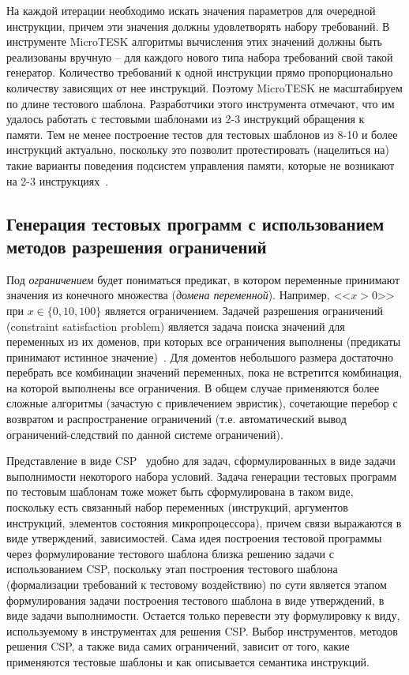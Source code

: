 На каждой итерации необходимо искать значения параметров для очередной инструкции, причем эти значения должны удовлетворять набору требований. В инструменте MicroTESK алгоритмы вычисления этих значений должны быть реализованы вручную -- для каждого нового типа набора требований свой такой генератор. Количество требований к одной инструкции прямо пропорционально количеству зависящих от нее инструкций. Поэтому MicroTESK не масштабируем по длине тестового шаблона. Разработчики этого инструмента отмечают, что им удалось работать с тестовыми шаблонами из 2-3 инструкций обращения к памяти. Тем не менее построение тестов для тестовых шаблонов из 8-10 и более инструкций актуально, поскольку это позволит протестировать (нацелиться на) такие варианты поведения подсистем управления памяти, которые не возникают на 2-3 инструкциях~\cite{my_preprint}.

\subsection{Генерация тестовых программ с использованием методов
разрешения ограничений}

Под \emph{ограничением} будет пониматься предикат, в котором
переменные принимают значения из конечного множества (\emph{домена переменной}). Например, <<$x >
0$>> при $x \in \{0, 10, 100\}$ является ограничением. Задачей разрешения ограничений
(constraint satisfaction problem) является задача поиска значений
для переменных из их доменов, при которых все ограничения
выполнены (предикаты принимают истинное значение)~\cite{CSP}. Для доментов небольшого размера
достаточно перебрать все комбинации значений переменных, пока не
встретится комбинация, на которой выполнены все ограничения. В общем
случае применяются более сложные алгоритмы (зачастую с привлечением
эвристик), сочетающие перебор с возвратом и распространение
ограничений (т.е. автоматический вывод ограничений-следствий по
данной системе ограничений).

Представление в виде CSP~\cite{CSP} удобно для задач,
сформулированных в виде задачи выполнимости некоторого набора
условий. Задача генерации тестовых программ по тестовым шаблонам
тоже может быть сформулирована в таком виде, поскольку есть
связанный набор переменных (инструкций, аргументов инструкций,
элементов состояния микропроцессора), причем связи выражаются в виде
утверждений, зависимостей. Сама идея построения тестовой программы
через формулирование тестового шаблона близка решению задачи с
использованием CSP, поскольку этап построения тестового шаблона
(формализации требований к тестовому воздействию) по сути является
этапом формулирования задачи построения тестового шаблона в виде
утверждений, в виде задачи выполнимости. Остается только перевести
эту формулировку к виду, используемому в инструментах для решения
CSP. Выбор инструментов, методов решения CSP, а также вида самих
ограничений, зависит от того, какие применяются тестовые шаблоны и
как описывается семантика инструкций.


